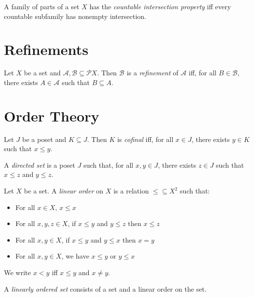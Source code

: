 \begin{df}
  A family of parts of a set $X$ has the \emph{countable intersection property} iff every countable subfamily has nonempty intersection.
\end{df}

\section{Refinements}

\begin{df}[Refinement]
  Let $X$ be a set and $\mathcal{A}, \mathcal{B} \subseteq \mathcal{P} X$. Then $\mathcal{B}$ is a \emph{refinement} of $\mathcal{A}$ iff, for all $B \in \mathcal{B}$, there exists $A \in \mathcal{A}$ such that $B \subseteq A$.
\end{df}

\section{Order Theory}

  \begin{df}[Cofinal]
  Let $J$ be a poset and $K \subseteq J$. Then $K$ is \emph{cofinal} iff, for
all $x \in J$, there exists $y \in K$ such that $x \leq y$.
\end{df}

  \begin{df}
  A \emph{directed set} is a poset $J$ such that, for all $x, y \in J$, there
exists $z \in J$ such that $x \leq z$ and $y \leq z$.
\end{df}

\begin{df}
  Let $X$ be a set. A \emph{linear order} on $X$ is a relation $\leq
  \subseteq X^2$ such that:
  \begin{itemize}
    \item For all $x \in X$, $x \leq x$
    \item For all $x, y, z \in X$, if $x \leq y$ and $y \leq z$ then $x \leq
    z$
    \item For all $x, y \in X$, if $x \leq y$ and $y \leq x$ then $x = y$
    \item For all $x, y \in X$, we have $x \leq y$ or $y \leq x$
  \end{itemize}
  We write $x < y$ iff $x \leq y$ and $x \neq y$.

  A \emph{linearly ordered set} consists of a set and a linear order on the
  set.
\end{df}

